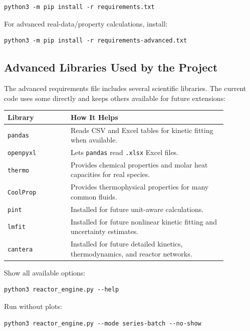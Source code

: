 \documentclass[11pt]{article}
\begin{document}
\begin{lstlisting}
python3 -m pip install -r requirements.txt
\end{lstlisting}

For advanced real-data/property calculations, install:

\begin{lstlisting}
python3 -m pip install -r requirements-advanced.txt
\end{lstlisting}


\subsection{Advanced Libraries Used by the Project}

The advanced requirements file includes several scientific libraries. The current code uses some directly and keeps others available for future extensions:

\begin{center}
\begin{tabular}{p{0.25\linewidth} p{0.62\linewidth}}
\toprule
\textbf{Library} & \textbf{How It Helps} \\
\midrule
\texttt{pandas} & Reads CSV and Excel tables for kinetic fitting when available. \\
\texttt{openpyxl} & Lets \texttt{pandas} read \texttt{.xlsx} Excel files. \\
\texttt{thermo} & Provides chemical properties and molar heat capacities for real species. \\
\texttt{CoolProp} & Provides thermophysical properties for many common fluids. \\
\texttt{pint} & Installed for future unit-aware calculations. \\
\texttt{lmfit} & Installed for future nonlinear kinetic fitting and uncertainty estimates. \\
\texttt{cantera} & Installed for future detailed kinetics, thermodynamics, and reactor networks. \\
\bottomrule
\end{tabular}
\end{center}

Show all available options:

\begin{lstlisting}
python3 reactor_engine.py --help
\end{lstlisting}

Run without plots:

\begin{lstlisting}
python3 reactor_engine.py --mode series-batch --no-show
\end{lstlisting}
\end{document}
